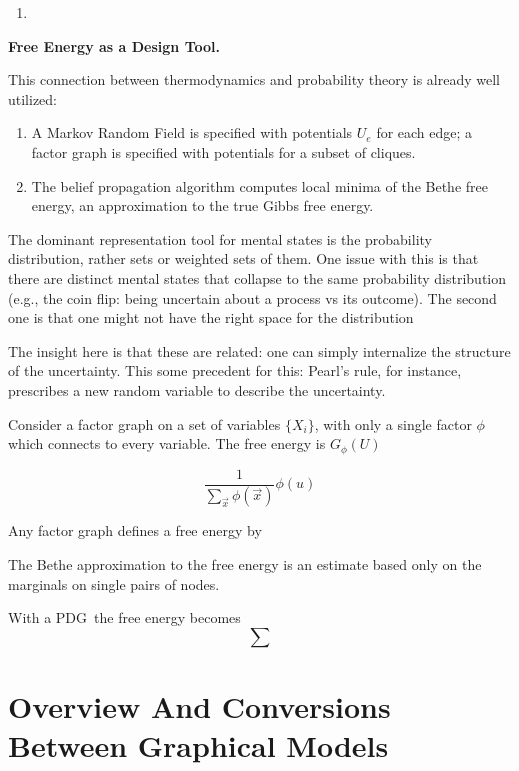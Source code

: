 \documentclass{article}
\newcommand{\MN}{PDG}
\numberwithin{equation}{section}
\begin{document}
\begin{notfocus}
\begin{enumerate}
		\item 
	\end{enumerate}

	
	


	
	\textbf{Free Energy as a Design Tool.}
	
	This connection between thermodynamics and probability theory is already well utilized:
	\begin{enumerate}
		\item A Markov Random Field is specified with potentials $U_e$ for each edge; a factor graph is specified with potentials for a subset of cliques.
		\item The belief propagation algorithm computes local minima of the Bethe free energy, an approximation to the true Gibbs free energy.
	\end{enumerate}


	The dominant representation tool for mental states is the probability distribution, rather sets or weighted sets of them. %
	One issue with this is that there are distinct mental states that collapse to the same probability distribution (e.g., the coin flip: being uncertain about a process vs its outcome). The second one is that one might not have the right space for the distribution
	
	The insight here is that these are related: one can simply internalize the structure of the uncertainty. This some precedent for this: Pearl's rule, for instance, prescribes a new random variable to describe the uncertainty.	
	
	Consider a factor graph on a set of variables $\{ X_i \}$, with only a single factor $\phi$ which connects to every variable. The free energy is $G_\phi(U)$
	
	\[ \frac{1}{\sum_{\vec x} \phi(\vec x)} \phi(u) \]
	
	
	Any factor graph defines a free energy by 
	
	The Bethe approximation to the free energy is an estimate based only on the marginals on single pairs of nodes.
		
	With a \MN\, the free energy becomes
	\[ \sum \]
	
	\section{Overview And Conversions Between Graphical Models}
	\label{sec:many-relations-graphical-models}
	

\end{notfocus}
\end{document}
